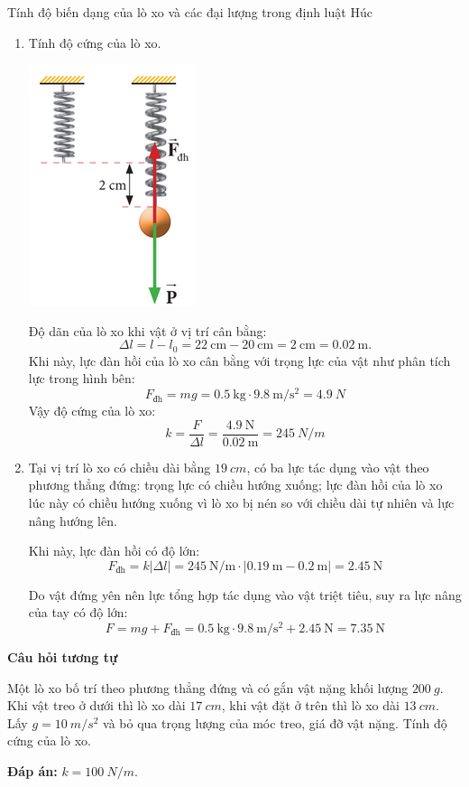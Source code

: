 \begin{dang}{Tính độ biến dạng của lò xo và các đại lượng trong định luật Húc}
{		\begin{enumerate}[label=\alph*)]
			\item Tính độ cứng của lò xo.
			\begin{center}
				\includegraphics[scale=0.6]{../figs/G10-028-4}
			\end{center}
			
			Độ dãn của lò xo khi vật ở vị trí cân bằng:
			$$\Delta l = l - l_0 = \SI{22}{\centi\meter} - \SI{20}{\centi\meter} = \SI{2}{\centi\meter}=\SI{0.02}{\meter}.$$
			Khi này, lực đàn hồi của lò xo cân bằng với trọng lực của vật như phân tích lực trong hình bên:
			$$F_\text{đh} = m g = \SI{0.5}{\kilogram} \cdot \SI{9.8}{\meter/\second^2} = \SI{4.9}{N}$$
			Vậy độ cứng của lò xo:
			$$k=\dfrac{F}{\Delta l} = \dfrac{\SI{4.9}{\newton}}{\SI{0.02}{\meter}} = \SI{245}{N/m}$$
			
			\item Tại vị trí lò xo có chiều dài bằng $\SI{19}{cm}$, có ba lực tác dụng vào vật theo phương thẳng đứng: trọng lực có chiều hướng xuống; lực đàn hồi của lò xo lúc này có chiều hướng xuống vì lò xo bị nén so với chiều dài tự nhiên và lực nâng hướng lên.
			
			Khi này, lực đàn hồi có độ lớn:
			$$F_\text{đh} = k |\Delta l| = \SI{245}{\newton/\meter} \cdot |\SI{0.19}{\meter} - \SI{0.2}{\meter}| = \SI{2.45}{\newton}$$
			
			Do vật đứng yên nên lực tổng hợp tác dụng vào vật triệt tiêu, suy ra lực nâng của tay có độ lớn:
			$$F=m  g + F_\text{đh} =\SI{0.5}{\kilogram}\cdot\SI{9.8}{\meter/\second^2} + \SI{2.45}{\newton} = \SI{7.35}{\newton}$$
		\end{enumerate}
		
		\begin{center}
			\textbf{Câu hỏi tương tự}
		\end{center}
		
		Một lò xo bố trí theo phương thẳng đứng và có gắn vật nặng khối lượng $\SI{200}{g}$. Khi vật treo ở dưới thì lò xo dài $\SI{17}{cm}$, khi vật đặt ở trên thì lò xo dài $\SI{13}{cm}$. Lấy $g=\SI{10}{m/s^2}$ và bỏ qua trọng lượng của móc treo, giá đỡ vật nặng. Tính độ cứng của lò xo.
		
		\textbf{Đáp án:} $k=\SI{100}{N/m}$.
	}
\end{dang}
